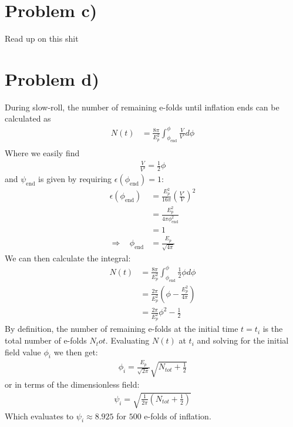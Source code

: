 \documentclass[reprint,english,notitlepage]{revtex4-1}  %
\numberwithin{equation}{section}
\begin{document}
\section{Problem c)}
Read up on this shit

\section{Problem d)}
During slow-roll, the number of remaining e-folds until inflation ends can be
calculated as
\begin{align}
	N(t) &= \frac{8\pi}{E_p^2} \int_{\phi_{\mathrm{end}}}^\phi \frac{V}{V'} d\phi \\
\end{align}
Where we easily find
\begin{align}
	\frac{V}{V'} = \frac{1}{2}\phi
\end{align}
and $\psi_{\mathrm{end}}$ is given by requiring $\epsilon(\phi_{\mathrm{end}})=1$:
\begin{align}
	\epsilon(\phi_{\mathrm{end}}) &= \frac{E_p^2}{16\pi} \left(\frac{V'}{V}\right)^2 \\
											 &= \frac{E_p^2}{4\pi \phi_{\mathrm{end}}^2} \\
											 &= 1 \\
	\Rightarrow \ \ \ \ \phi_{\mathrm{end}} &= \frac{E_p}{\sqrt{4\pi}}
\end{align}
We can then calculate the integral:
\begin{align}
	N(t) &= \frac{8\pi}{E_p^2} \int_{\phi_{\mathrm{end}}}^\phi \frac{1}{2}\phi d\phi \\
					&= \frac{2\pi}{E_p^2} \left(\phi -\frac{E_p^2}{4\pi} \right) \\
					&= \frac{2\pi}{E_p^2} \phi^2 - \frac{1}{2}
\end{align}
By definition, the number of remaining e-folds at the initial time $t=t_i$ is
the total number of e-folds $N_tot$. Evaluating $N(t)$ at $t_i$ and solving for
the initial field value $\phi_i$ we then get:
\begin{align}
	\phi_i = \frac{E_p}{\sqrt{2\pi}}\sqrt{N_{tot} + \frac{1}{2}}
\end{align}
or in terms of the dimensionless field:
\begin{align}
	\psi_i = \sqrt{ \frac{1}{2\pi} \left(N_{tot} + \frac{1}{2} \right) }
\end{align}
Which evaluates to $\psi_i \approx 8.925$ for $500$ e-folds of inflation.
\end{document}
